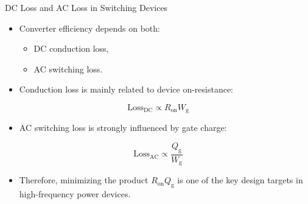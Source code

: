 \begin{frame}{DC Loss and AC Loss in Switching Devices}

\begin{itemize}
    \item Converter efficiency depends on both:
    \begin{itemize}
        \item DC conduction loss,
        \item AC switching loss.
    \end{itemize}

    \item Conduction loss is mainly related to device on-resistance:
\end{itemize}

\begin{equation}
\mathrm{Loss}_{\mathrm{DC}}
\propto
R_{\mathrm{on}} W_{\mathrm{g}}
\end{equation}

\begin{itemize}
    \item AC switching loss is strongly influenced by gate charge:
\end{itemize}

\begin{equation}
\mathrm{Loss}_{\mathrm{AC}}
\propto
\frac{Q_{\mathrm{g}}}{W_{\mathrm{g}}}
\end{equation}

\begin{itemize}
    \item Therefore, minimizing the product $R_{\mathrm{on}}Q_{\mathrm{g}}$ is one of the key design targets in high-frequency power devices.
\end{itemize}

\end{frame}


